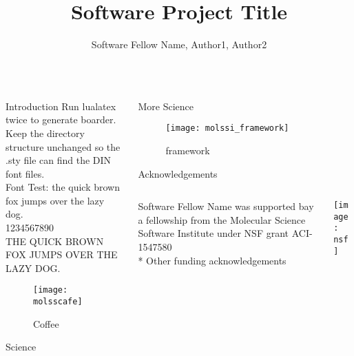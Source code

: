 \documentclass{beamer}
\title{Software Project Title}
\author{Software Fellow Name, Author1, Author2}
\institute{Author Affiliations}
\begin{document}
  \rmfamily


  \begin{frame}
    \vfill

    \begin{columns}[t]

      \begin{column}{.417\linewidth}

        \begin{section}{Introduction}
          Run lualatex twice to generate boarder.\\
          Keep the directory structure unchanged so the .sty file can find the DIN font files.\\
          Font Test: the quick brown fox jumps over the lazy dog.\\
          1234567890\\
          THE QUICK BROWN FOX JUMPS OVER THE LAZY DOG.\\
          
          \bigskip
          \bigskip
          \lipsum[1-2]

          \begin{figure}[h]
            \texttt{[image: molsscafe]}
            \caption{Coffee}
          \end{figure}
        \end{section}

        \begin{section}{Science}
          \lipsum[1]
        \end{section}

      \end{column}

      \begin{column}{.417\linewidth}

        \begin{section}{More Science}
          \lipsum[1-4]

          \begin{figure}[h]
            \texttt{[image: molssi\_framework]}
            \caption{framework}
          \end{figure}
        \end{section}

        \begin{section}{Acknowledgements}
          \begin{columns}
            \begin{column}{.75\linewidth}
            Software Fellow Name was supported bay a fellowship from the Molecular Science Software Institute under NSF grant ACI-1547580\\
* Other funding acknowledgements
            \end{column}
            \begin{column}{.2\linewidth}
              \texttt{[image: nsf]}
            \end{column}
          \end{columns}


\end{section}
\end{column}
\end{columns}
\end{frame}
\end{document}
